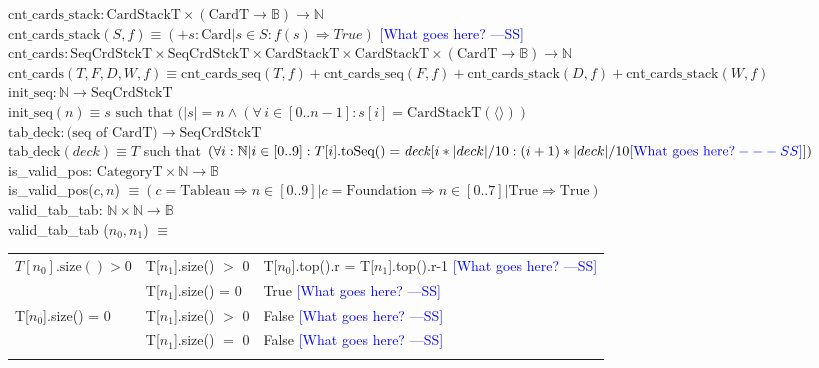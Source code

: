 \documentclass[12pt]{article}
\newcommand{\authornote}[3]{\textcolor{#1}{[#3 ---#2]}}
\newcommand{\authornote}[3]{}
\newcommand{\wss}[1]{\authornote{blue}{SS}{#1}}
\begin{document}
\noindent $\text{cnt\_cards\_stack}: \text{CardStackT} \times (\text{CardT}
\rightarrow \mathbb{B}) \rightarrow \mathbb{N}$\\
\noindent $\text{cnt\_cards\_stack}(S, f) \equiv (+ s: \text{Card} | s \in S :
f(s) \Rightarrow True )$ \wss{What goes here?}\\

\noindent $\text{cnt\_cards}: \text{SeqCrdStckT} \times \text{SeqCrdStckT}
\times \text{CardStackT} \times \text{CardStackT} \times (\text{CardT}
\rightarrow \mathbb{B}) \rightarrow \mathbb{N}$\\
\noindent $\text{cnt\_cards}(T, F, D, W, f) \equiv \text{cnt\_cards\_seq}(T,
f) + \text{cnt\_cards\_seq}(F, f) + \text{cnt\_cards\_stack}(D, f) +
\text{cnt\_cards\_stack}(W, f)$\\

\noindent $\text{init\_seq}: \mathbb{N} \rightarrow \text{SeqCrdStckT}$\\
\noindent $\text{init\_seq}(n) \equiv s \text{ such that } (|s| = n \land (\forall\, i
\in [0..n-1] : s[i] = \text{CardStackT}(\langle \rangle))$\\

\noindent $\text{tab\_deck}: \text{(seq of CardT)} \rightarrow \text{SeqCrdStckT}$\\
\noindent $\text{tab\_deck} (\mathit{deck}) \equiv T$ such that
$(\forall i: \mathbb{N} | i \in [0..9] : T[i].\text{toSeq}() =
\mathit{deck}[i*|deck|/10:(i+1)*|deck|/10\wss{\text{What goes here?}}])$\\

\noindent is\_valid\_pos: $ \text{CategoryT} \times \mathbb{N} \rightarrow \mathbb{B}$\\
\noindent is\_valid\_pos($c, n$) $\equiv (c = \text{Tableau} \Rightarrow n \in
[0..9] | c = \text{Foundation} \Rightarrow n \in [0..7] | \text{True} \Rightarrow \text{True})$\\

\noindent valid\_tab\_tab: $\mathbb{N} \times \mathbb{N} \rightarrow \mathbb{B}$\\
\noindent valid\_tab\_tab ($n_0, n_1$) $\equiv$

\begin{tabular}{|p{4cm}|p{3.5cm}|l|}
\hhline{|-|-|-|}
$T[n_0].\text{size}() > 0$ & T[$n_1$].size() $>$ 0 & T[$n_0$].top().r = T[$n_1$].top().r-1  \wss{What goes here?}\\
\hhline{|~|-|-|}
 & T[$n_1$].size() = 0 & True \wss{What goes here?}\\
\hhline{|-|-|-|}
T[$n_0$].size() = 0 & T[$n_1$].size() $>$ 0 & False \wss{What goes here?}\\
\hhline{|~|-|-|}
& T[$n_1$].size() $=$ 0 & False \wss{What goes here?}\\
\hhline{|-|-|-|}
\end{tabular}\\\\
\end{document}

